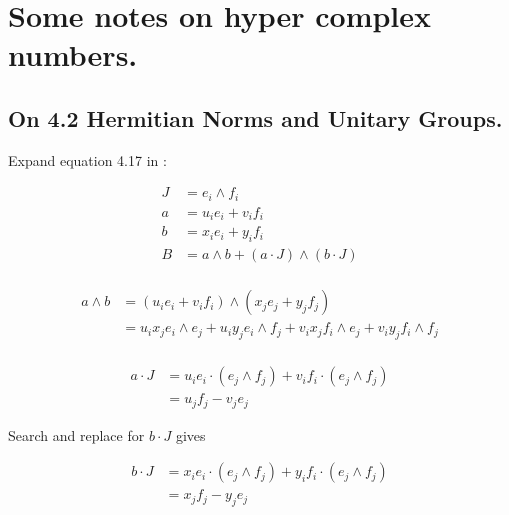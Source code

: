 
%
%







\chapter{Some notes on hyper complex numbers. }

%

\section{On 4.2 Hermitian Norms and Unitary Groups. }

Expand equation 4.17 in \cite{DoranHamiltonian} :

\begin{align*}
J &= e_i \wedge f_i \\
a &= u_i e_i + v_i f_i \\
b &= x_i e_i + y_i f_i \\
B &= a \wedge b + (a \cdot J) \wedge (b \cdot J)  \\
\end{align*}

\begin{align*}
a \wedge b
&= (u_i e_i + v_i f_i) \wedge (x_j e_j + y_j f_j) \\
&= 
u_i x_j e_i \wedge e_j 
+ u_i y_j e_i \wedge f_j
+ v_i x_j f_i \wedge e_j
+ v_i y_j f_i \wedge f_j \\
\end{align*}

\begin{align*}
a \cdot J
&=
u_i e_i \cdot ( e_j \wedge f_j )
+ v_i f_i \cdot ( e_j \wedge f_j ) \\
&= u_j f_j - v_j e_j
\end{align*}

Search and replace for $b \cdot J$ gives

\begin{align*}
b \cdot J
&=
x_i e_i \cdot ( e_j \wedge f_j )
+ y_i f_i \cdot ( e_j \wedge f_j ) \\
&= x_j f_j - y_j e_j
\end{align*}

